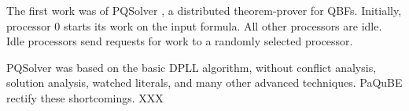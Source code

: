 \documentclass[runningheads]{llncs}
\begin{document}
The first work was of PQSolver \cite{FeldmannMS00}, a distributed theorem-prover for QBFs. Initially, processor 0 starts its work on the input formula. All other processors are idle. Idle processors send requests for work to a randomly selected processor. 

PQSolver was based on the basic DPLL algorithm, without conflict analysis, solution analysis, watched literals, and many
other advanced techniques. PaQuBE 
\cite{LewisMSNBG09} rectify these shortcomings. XXX
%

 
 
\end{document}

